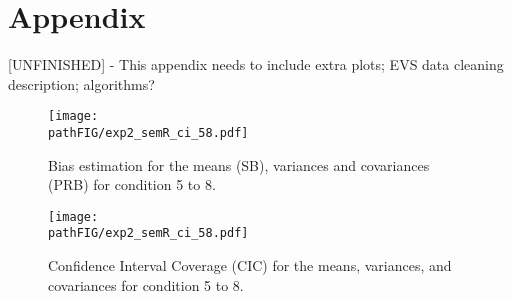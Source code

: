 \section{Appendix}

[UNFINISHED] - This appendix needs to include extra plots; EVS data cleaning description; algorithms?

\begin{figure}[h]
	\centering
	\texttt{[image: \\pathFIG/exp2\_semR\_ci\_58.pdf]}
	\caption{Bias estimation for the means (SB), variances and covariances (PRB) for condition 5 
			to 8.}
	\label{fig:exp2bias58}
\end{figure}

\begin{figure}[h]
	\centering
	\texttt{[image: \\pathFIG/exp2\_semR\_ci\_58.pdf]}
	\caption{Confidence Interval Coverage (CIC) for the means, variances, and covariances 
			for condition 5 to 8.}
	\label{fig:exp2cir58}
\end{figure}

\FloatBarrier

